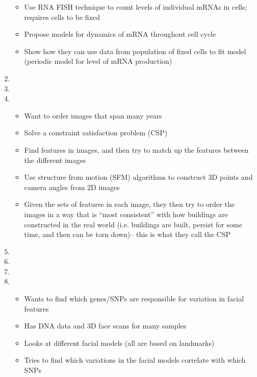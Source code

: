 \documentclass[12pt]{article}
\begin{document}
\begin{enumerate}
\begin{itemize}
	\item Use RNA FISH technique to count levels of individual mRNAs in cells; requires cells to be fixed
	\item Propose models for dynamics of mRNA throughout cell cycle
	\item Show how they can use data from population of fixed cells to fit model (periodic model for level of mRNA production)
\end{itemize}

\item {}

\item {}

\item {}
\begin{itemize}
	\item Want to order images that span many years
	\item Solve a constraint satisfaction problem (CSP)
	\item Find features in images, and then try to match up the features between the different images
	\item Use structure from motion (SFM) algorithms to construct 3D points and camera angles from 2D images
	\item Given the sets of features in each image, they then try to order the images in a way that is ``most consistent'' with how buildings are constructed in the real world (i.e. buildings are built, persist for some time, and then can be torn down)-- this is what they call the CSP
\end{itemize}
\item {}

\item {}

\item {}

\item {}
\begin{itemize}
	\item Wants to find which genes/SNPs are responsible for variation in facial features
	\item Has DNA data and 3D face scans for many samples
	\item Looks at different facial models (all are based on landmarks)
	\item Tries to find which variations in the facial models correlate with which SNPs
\end{itemize}


\end{enumerate}
\end{document}
